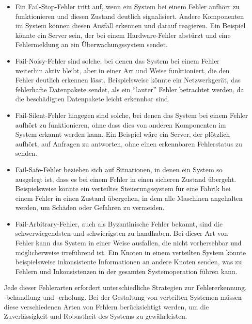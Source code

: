 \documentclass[../vs-script-first-v01.tex]{subfiles}
\begin{document}
\begin{itemize}
\item Ein Fail-Stop-Fehler tritt auf, wenn ein System bei einem Fehler aufhört zu funktionieren und diesen Zustand deutlich signalisiert. Andere Komponenten im System können diesen Ausfall erkennen und darauf reagieren. Ein Beispiel könnte ein Server sein, der bei einem Hardware-Fehler abstürzt und eine Fehlermeldung an ein Überwachungssystem sendet.

\item Fail-Noisy-Fehler sind solche, bei denen das System bei einem Fehler weiterhin aktiv bleibt, aber in einer Art und Weise funktioniert, die den Fehler deutlich erkennen lässt. Beispielsweise könnte ein Netzwerkgerät, das fehlerhafte Datenpakete sendet, als ein \enquote{lauter} Fehler betrachtet werden, da die beschädigten Datenpakete leicht erkennbar sind.

\item Fail-Silent-Fehler hingegen sind solche, bei denen das System bei einem Fehler aufhört zu funktionieren, ohne dass dies von anderen Komponenten im System erkannt werden kann. Ein Beispiel wäre ein Server, der plötzlich aufhört, auf Anfragen zu antworten, ohne einen erkennbaren Fehlerstatus zu senden.

\item Fail-Safe-Fehler beziehen sich auf Situationen, in denen ein System so ausgelegt ist, dass es bei einem Fehler in einen sicheren Zustand übergeht. Beispielsweise könnte ein verteiltes Steuerungssystem für eine Fabrik bei einem Fehler in einen Zustand übergehen, in dem alle Maschinen angehalten werden, um Schäden oder Gefahren zu vermeiden.

\item Fail-Arbitrary-Fehler, auch als Byzantinische Fehler bekannt, sind die schwerwiegendsten und schwierigsten zu handhaben. Bei dieser Art von Fehler kann das System in einer Weise ausfallen, die nicht vorhersehbar und möglicherweise irreführend ist. Ein Knoten in einem verteilten System könnte beispielsweise inkonsistente Informationen an andere Knoten senden, was zu Fehlern und Inkonsistenzen in der gesamten Systemoperation führen kann.
\end{itemize}
Jede dieser Fehlerarten erfordert unterschiedliche Strategien zur Fehlererkennung, -behandlung und -erholung. Bei der Gestaltung von verteilten Systemen müssen diese verschiedenen Arten von Fehlern berücksichtigt werden, um die Zuverlässigkeit und Robustheit des Systems zu gewährleisten.
\end{document}
